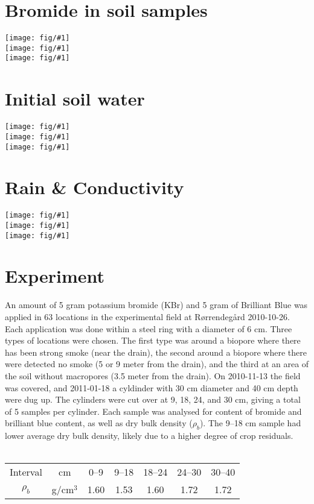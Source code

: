 \documentclass[a4paper]{article}
\newcommand{\fig}[1]{\texttt{[image: fig/\#1]}}
\begin{document}
\section*{Bromide in soil samples}

\noindent\fig{without-Br}\\
\fig{macro-Br}\\
\fig{drain-Br}

\section*{Initial soil water}

\noindent\fig{without-Pres}\\
\fig{macro-Pres}\\
\fig{drain-Pres}

\section*{Rain \& Conductivity}

\noindent\fig{rain}\\
\noindent\fig{conductivity}\\
\noindent\fig{conductivity_2}


\pagebreak{}
\section*{Experiment}

An amount of 5 gram potassium bromide (KBr) and 5 gram of Brilliant
Blue was applied in 63 locations in the experimental field at
Rørrendegård 2010-10-26.  Each application was done within a steel
ring with a diameter of 6 cm.  Three types of locations were chosen.
The first type was around a biopore where there has been strong smoke
(near the drain), the second around a biopore where there were
detected no smoke (5 or 9 meter from the drain), and the third at an
area of the soil without macropores (3.5 meter from the drain).  On
2010-11-13 the field was covered, and 2011-01-18 a cyldinder with 30
cm diameter and 40 cm depth were dug up. The cylinders were cut over
at 9, 18, 24, and 30 cm, giving a total of 5 samples per cylinder.
Each sample was analysed for content of bromide and brilliant blue
content, as well as dry bulk density ($\rho_b$).  The 9--18 cm sample
had lower average
dry bulk density, likely due to a higher degree of crop residuals.\\\\
\begin{tabular}{|c|c|ccccc|}\hline
  Interval & cm & 0--9 & 9--18 & 18--24 & 24--30 & 30--40\\
  $\rho_b$ & g/cm$^3$ & 1.60 & 1.53 & 1.60 & 1.72 & 1.72\\\hline
\end{tabular}\\
\end{document}
